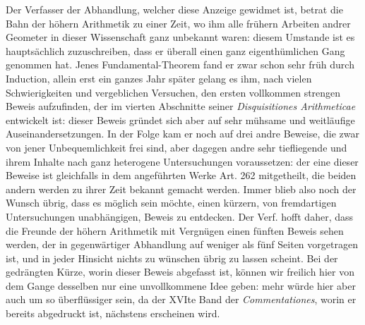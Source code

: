 Der Verfasser der Abhandlung, welcher diese Anzeige gewidmet ist, betrat die Bahn der höhern Arithmetik zu einer Zeit, wo ihm alle frühern Arbeiten andrer Geometer in dieser Wissenschaft ganz unbekannt waren: diesem Umstande ist es hauptsächlich zuzuschreiben, dass er überall einen ganz eigenthümlichen Gang genommen hat. Jenes Fundamental-Theorem fand er zwar schon sehr früh durch Induction, allein erst ein ganzes Jahr später gelang es ihm, nach vielen Schwierigkeiten und vergeblichen Versuchen, den ersten vollkommen strengen Beweis aufzufinden, der im vierten Abschnitte seiner \emph{Disquisitiones Arithmeticae} entwickelt ist: dieser Beweis gründet sich aber auf sehr mühsame und weitläufige Auseinandersetzungen. In der Folge kam er noch auf drei andre Beweise, die zwar von jener Unbequemlichkeit frei sind, aber dagegen andre sehr tiefliegende und ihrem Inhalte nach ganz heterogene Untersuchungen voraussetzen: der eine dieser Beweise ist gleichfalls in dem angeführten Werke Art. 262 mitgetheilt, die beiden andern werden zu ihrer Zeit bekannt gemacht werden. Immer blieb also noch der Wunsch übrig, dass es möglich sein möchte, einen kürzern, von fremdartigen Untersuchungen unabhängigen, Beweis zu entdecken. Der Verf. hofft daher, dass die Freunde der höhern Arithmetik mit Vergnügen einen fünften Beweis sehen werden, der in gegenwärtiger Abhandlung auf weniger als fünf Seiten vorgetragen ist, und in jeder Hinsicht nichts zu wünschen übrig zu lassen scheint. Bei der gedrängten Kürze, worin dieser Beweis abgefasst ist, können wir freilich hier von dem Gange desselben nur eine unvollkommene Idee geben: mehr würde hier aber auch um so überflüssiger sein, da der XVIte Band der \emph{Commentationes}, worin er bereits abgedruckt ist, nächstens erscheinen wird.


